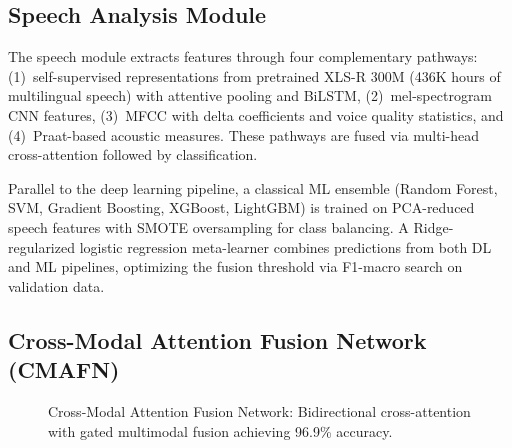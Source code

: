 \documentclass[10pt,conference,letterpaper]{IEEEtran}
\begin{document}
\subsection{Speech Analysis Module}

The speech module extracts features through four complementary pathways: (1)~self-supervised representations from pretrained XLS-R 300M (436K hours of multilingual speech) with attentive pooling and BiLSTM, (2)~mel-spectrogram CNN features, (3)~MFCC with delta coefficients and voice quality statistics, and (4)~Praat-based acoustic measures. These pathways are fused via multi-head cross-attention followed by classification.

Parallel to the deep learning pipeline, a classical ML ensemble (Random Forest, SVM, Gradient Boosting, XGBoost, LightGBM) is trained on PCA-reduced speech features with SMOTE oversampling for class balancing. A Ridge-regularized logistic regression meta-learner combines predictions from both DL and ML pipelines, optimizing the fusion threshold via F1-macro search on validation data.

\subsection{Cross-Modal Attention Fusion Network (CMAFN)}

\begin{figure}[h]
\centering
{}
\caption{Cross-Modal Attention Fusion Network: Bidirectional cross-attention with gated multimodal fusion achieving 96.9\% accuracy.}
\label{fig:cmafn}
\end{figure}
\end{document}
